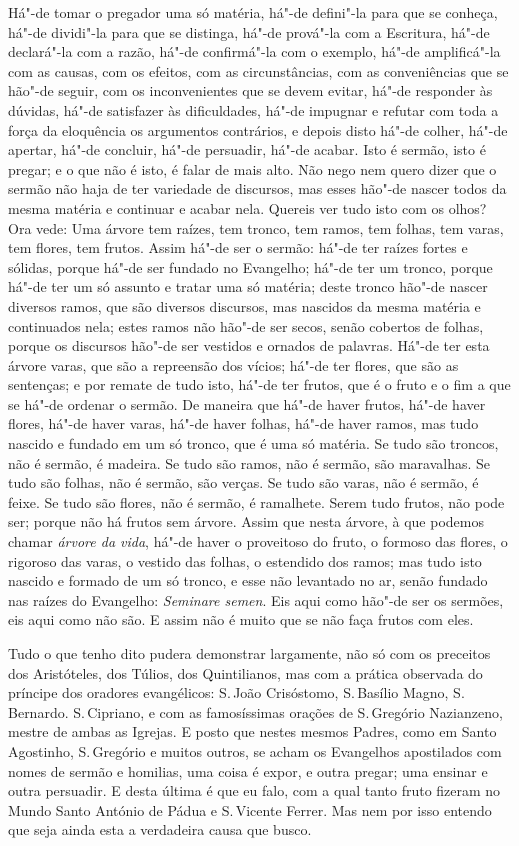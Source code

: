 Há"-de tomar o pregador uma só matéria, há"-de defini"-la para
que se conheça, há"-de dividi"-la para que se distinga, há"-de prová"-la
com a Escritura, há"-de declará"-la com a razão, há"-de confirmá"-la com o
exemplo, há"-de amplificá"-la com as causas, com os efeitos, com as circunstâncias, com as conveniências que se hão"-de seguir,
com os inconvenientes que se devem evitar, há"-de responder às dúvidas,
há"-de satisfazer às dificuldades, há"-de impugnar e refutar com toda a
força da eloquência os argumentos contrários, e depois disto há"-de
colher, há"-de apertar, há"-de concluir, há"-de persuadir, há"-de acabar.
Isto é sermão, isto é pregar; e o que não é isto, é falar de mais alto.
Não nego nem quero dizer que o sermão não haja de ter variedade de
discursos, mas esses hão"-de nascer todos da mesma matéria e continuar e
acabar nela. Quereis ver tudo isto com os olhos? Ora vede: Uma árvore
tem raízes, tem tronco, tem ramos, tem folhas, tem varas, tem flores,
tem frutos. Assim há"-de ser o sermão: há"-de ter raízes fortes e sólidas,
porque há"-de ser fundado no Evangelho; há"-de ter um tronco, porque
há"-de ter um só assunto e tratar uma só matéria; deste tronco hão"-de
nascer diversos ramos, que são diversos discursos, mas nascidos da
mesma matéria e continuados nela; estes ramos não hão"-de ser secos, senão cobertos de folhas, porque os discursos hão"-de ser vestidos e
ornados de palavras. Há"-de ter esta árvore varas, que são a repreensão
dos vícios; há"-de ter flores, que são as sentenças; e por remate de tudo
isto, há"-de ter frutos, que é o fruto e o fim a que se há"-de ordenar o
sermão. De maneira que há"-de haver frutos, há"-de haver flores, há"-de
haver varas, há"-de haver folhas, há"-de haver ramos, mas tudo nascido e
fundado em um só tronco, que é uma só matéria. Se tudo são troncos, não
é sermão, é madeira. Se tudo são ramos, não é sermão, são maravalhas. Se
tudo são folhas, não é sermão, são verças. Se tudo são varas, não é
sermão, é feixe. Se tudo são flores, não é sermão, é ramalhete. Serem
tudo frutos, não pode ser; porque não há frutos sem árvore. Assim que
nesta árvore, à que podemos chamar \emph{árvore da vida}, há"-de haver o
proveitoso do fruto, o formoso das flores, o rigoroso das varas,
o vestido das folhas, o estendido dos ramos; mas tudo isto
nascido e formado de um só tronco, e esse não levantado no ar, senão
fundado nas raízes do Evangelho: \emph{Seminare semen}. Eis aqui como
hão"-de ser os sermões, eis aqui como não são. E assim não é muito que se
não faça frutos com eles.

Tudo o que tenho dito pudera demonstrar largamente, não só com os
preceitos dos Aristóteles, dos Túlios, dos Quintilianos, mas com a
prática observada do príncipe dos oradores evangélicos: S.\,João
Crisóstomo, S.\,Basílio Magno, S.\,Bernardo. S.\,Cipriano, e com as
famosíssimas orações de S.\,Gregório Nazianzeno, mestre de ambas as
Igrejas. E posto que nestes mesmos Padres, como em Santo Agostinho, S.\,Gregório e muitos outros, se acham os Evangelhos apostilados com nomes
de sermão e homilias, uma coisa é expor, e outra pregar; uma ensinar e
outra persuadir. E desta última é que eu falo, com a qual tanto fruto
fizeram no Mundo Santo António de Pádua e S.\,Vicente Ferrer. Mas nem por
isso entendo que seja ainda esta a verdadeira causa que busco.

